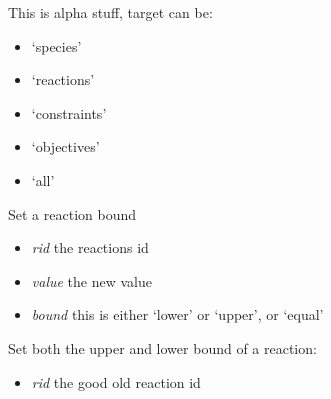 \documentclass[a4paper,11pt,english]{sphinxmanual}
\begin{document}
\begin{fulllineitems}
\begin{fulllineitems}
\begin{itemize}
\end{itemize}

\end{fulllineitems}


\begin{fulllineitems}
\label{modules_doc:cbmpy.CBModel.Model.setPrefix}
This is alpha stuff, target can be:
\begin{itemize}
\item {} 
`species'

\item {} 
`reactions'

\item {} 
`constraints'

\item {} 
`objectives'

\item {} 
`all'

\end{itemize}

\end{fulllineitems}


\begin{fulllineitems}
\label{modules_doc:cbmpy.CBModel.Model.setReactionBound}
Set a reaction bound
\begin{itemize}
\item {} 
\emph{rid} the reactions id

\item {} 
\emph{value} the new value

\item {} 
\emph{bound} this is either `lower' or `upper', or `equal'

\end{itemize}

\end{fulllineitems}


\begin{fulllineitems}
\label{modules_doc:cbmpy.CBModel.Model.setReactionBounds}
Set both the upper and lower bound of a reaction:
\begin{itemize}
\item {} 
\emph{rid} the good old reaction id


\end{itemize}
\end{fulllineitems}
\end{fulllineitems}
\end{document}
